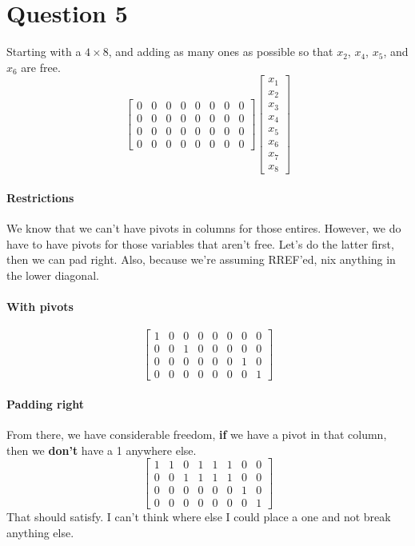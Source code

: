\documentclass{article}
\begin{document}
    \section{Question 5}
        Starting with a $4\times 8$, and adding as many ones as possible so that
        $x_2$, $x_4$, $x_5$, and $x_6$ are free.
        \[
            \begin{bmatrix}0&0&0&0&0&0&0&0\\0&0&0&0&0&0&0&0\\0&0&0&0&0&0&0&0\\0&0&0&0&0&0&0&0\end{bmatrix}
            \begin{bmatrix}x_1\\x_2\\x_3\\x_4\\x_5\\x_6\\x_7\\x_8\end{bmatrix}
        \]
        \paragraph{Restrictions}
            We know that we can't have pivots in columns for those entires.
            However, we do have to have pivots for those variables that aren't free.
            Let's do the latter first, then we can pad right.
            Also, because we're assuming RREF'ed, nix anything in the lower diagonal.
        \paragraph{With pivots}
        \[
        \begin{bmatrix}1&0&0&0&0&0&0&0\\0&0&1&0&0&0&0&0\\0&0&0&0&0&0&1&0\\0&0&0&0&0&0&0&1\end{bmatrix}
        \]
        \paragraph{Padding right}
            From there, we have considerable freedom, \textbf{if} we have a pivot in that column,
            then we \textbf{don't} have a 1 anywhere else.
            \[
                \begin{bmatrix}1&1&0&1&1&1&0&0\\0&0&1&1&1&1&0&0\\0&0&0&0&0&0&1&0\\0&0&0&0&0&0&0&1\end{bmatrix}
            \]
            That should satisfy. I can't think where else I could place a one and not break anything else.
\end{document}
